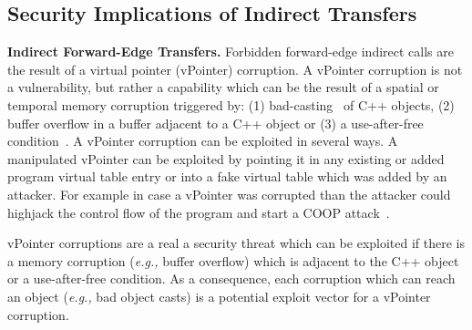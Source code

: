 \subsection{Security Implications of Indirect Transfers}
\label{Security Implications of Forbidden Forward Indirect Calls}
\textbf{Indirect Forward-Edge Transfers.} 
Forbidden forward-edge indirect calls are the result of a virtual pointer (vPointer) corruption. A vPointer corruption is not a vulnerability, but rather a capability which
can be the result of a spatial or temporal memory corruption triggered by: 
(1) bad-casting~\cite{byoungyoung:typecasting} of C++ objects, 
(2) buffer overflow in a buffer adjacent to a C++ object or 
(3) a use-after-free condition~\cite{schuster:coop}.
A vPointer corruption can be exploited in several ways. A manipulated vPointer can be exploited by pointing it in any existing or added program virtual 
table entry or into a fake virtual table which was added by an attacker. For example in case a vPointer
was corrupted than the attacker could highjack the control flow of the program and start a COOP attack~\cite{schuster:coop}.

vPointer corruptions are a real a security threat which can be exploited if there is a memory corruption (\textit{e.g.,} buffer overflow) which is adjacent 
to the C++ object or a use-after-free condition. As a consequence, each corruption which can reach an object (\textit{e.g.,} bad object casts) is a potential
exploit vector for a vPointer corruption. 


